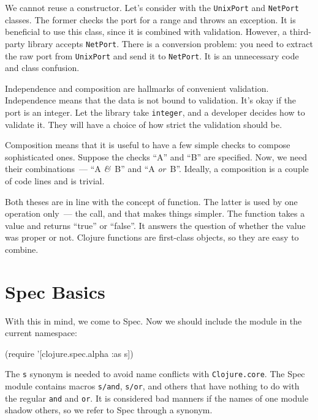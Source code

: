 We cannot reuse a constructor. Let's consider with the \verb|UnixPort| and \verb|NetPort| classes. The former checks the port for a range and throws an exception. It is beneficial to use this class, since it is combined with validation. However, a third-party library accepts \verb|NetPort|. There is a conversion problem: you need to extract the raw port from \verb|UnixPort| and send it to \verb|NetPort|. It is an unnecessary code and class confusion.


Independence and composition are hallmarks of convenient validation. Independence means that the data is not bound to validation. It's okay if the port is an integer. Let the library take \verb|integer|, and a developer decides how to validate it. They will have a choice of how strict the validation should be.


Composition means that it is useful to have a few simple checks to compose sophisticated ones. Suppose the checks ``A'' and ``B'' are specified. Now, we need their combinations~--- ``A  \emph{\&}~B'' and ``A \emph{or}~B''. Ideally, a composition is a couple of code lines and is trivial.


Both theses are in line with the concept of function.  The latter is used by one operation only~--- the call, and that makes things simpler. The function takes a value and returns ``true'' or ``false''. It answers the question of whether the value was proper or not. Clojure functions are first-class objects, so they are easy to combine.

\section{Spec Basics}

With this in mind, we come to Spec. Now we should include the module in the current namespace:

\begin{english}
  \begin{clojure}
(require '[clojure.spec.alpha :as s])
  \end{clojure}
\end{english}

The \verb|s| synonym is needed to avoid name conflicts with \verb|Clojure.core|. The Spec module contains macros \verb|s/and|, \verb|s/or|, and others that have nothing to do with the regular \verb|and| and \verb|or|. It is considered bad manners if the names of one module shadow others, so we refer to Spec through a synonym.

